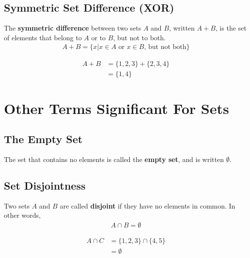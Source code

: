 \documentclass[../notes.tex]{subfiles}
\begin{document}
      \subsection{Symmetric Set Difference (XOR)}
        The \textbf{symmetric difference} between two sets $A$ and $B$, written $A + B$, is the set of elements that belong to $A$ or to $B$, but not to both.
        \begin{align*}
          A + B = \biggl\{x | x \in A \text{ or } x \in B\text{, but not both}\biggr\}
        \end{align*}
        \begin{center}
        \end{center}
        \begin{examplebox}
          \begin{align*}
            A + B &= \{1, 2, 3\} + \{2, 3, 4\}\\
            &= \{1, 4\}
          \end{align*}
        \end{examplebox}

    \section{Other Terms Significant For Sets}
      \subsection{The Empty Set}
        The set that contains no elements is called the \textbf{empty set}, and is written $\emptyset$.
      \subsection{Set Disjointness}
        Two sets $A$ and $B$ are called \textbf{disjoint} if they have no elements in common. In other words,
        \begin{align*}
          A \cap B = \emptyset
        \end{align*}
        \begin{examplebox}
          \begin{align*}
            A \cap C &= \{1, 2, 3\} \cap \{4, 5\}\\
            &= \emptyset
          \end{align*}
        \end{examplebox}
\end{document}

